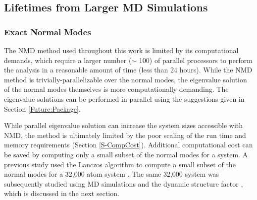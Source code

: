 % 

\subsection{\label{Future:Timescales}
Lifetimes from Larger MD Simulations}

\subsubsection{\label{Future:Timescales:NMD}
Exact Normal Modes}

The NMD method used throughout this work is limited by its computational 
demands, which require a larger number ($\sim$ 100) of parallel processors 
to perform the analysis in a reasonable amount of time 
(less than 24 hours).  
While the NMD method is trivially-parallelizable over the normal 
modes, the eigenvalue solution of the normal modes themselves 
is more computationally demanding. 
The eigenvalue solutions can be performed in parallel using the suggestions 
given in Section \ref{Future:Package}. 
 
While parallel eigenvalue solution can increase the system sizes 
accessible with NMD, the method is ultimately limited by the 
poor scaling of the run time and memory requirements 
(Section \ref{S-CompCost}). 
Additional computational cost can be saved by computing only 
a small subset of the normal modes for a system. 
A previous study used the 
\href{http://en.wikipedia.org/wiki/Lanczos_algorithm}
{Lanczos algorithm}\cite{golub_matrix_2012} 
to compute a small subset of the normal modes
for a 32,000 atom system \cite{mazzacurati_low-frequency_1996}.  
The same 32,000 system was subsequently studied using MD simulations 
and the dynamic structure factor \cite{ruocco_relaxation_2000}, 
which is discussed in the next section.

